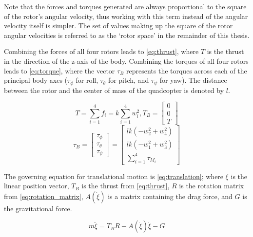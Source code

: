 \documentclass[letterpaper,12pt,titlepage,oneside,final]{book}
\begin{document}
Note that the forces and torques generated are always proportional to the square of the rotor's angular velocity, thus working with this term instead of the angular velocity itself is simpler. %
The set of values making up the square of the rotor angular velocities is referred to as the `rotor space' in the remainder of this thesis.

Combining the forces of all four rotors leads to \eqref{eq:thrust}, where $T$ is the thrust in the direction of the z-axis of the body. 
Combining the torques of all four rotors leads to \eqref{eq:torque}, where the vector $\tau_{B}$ represents the torques across each of the principal body axes ($\tau_{\phi}$ for roll, $\tau_{\theta}$ for pitch, and $\tau_{\psi}$ for yaw). 
The distance between the rotor and the center of mass of the quadcopter is denoted by $l$. 

\begin{equation} \label{eq:thrust}
T = \sum_{i=1}^{4} f_{i} = k\sum_{i=1}^{4} w^{2}_{i} , T_{B} = 
\begin{bmatrix}
0 \\
0 \\
T
\end{bmatrix}
\end{equation}
\begin{equation} \label{eq:torque}
\tau_{B} = 
\begin{bmatrix}
\tau_{\phi} \\
\tau_{\theta} \\
\tau_{\psi}
\end{bmatrix}
=
\begin{bmatrix}
lk(-w_{2}^{2}+w_{4}^{2}) \\
lk(-w_{1}^{2}+w_{3}^{2}) \\
\sum_{i=1}^{4}\tau_{M_{i}}
\end{bmatrix}
\end{equation}

The governing equation for translational motion is \eqref{eq:translation}; where $\xi$ is the linear position vector, $T_{B}$ is the thrust from \eqref{eq:thrust}, $R$ is the rotation matrix from \eqref{eq:rotation_matrix}, $A(\dot{\xi})$ is a matrix containing the drag force, and $G$ is the gravitational force.

\begin{equation} \label{eq:translation}
m\ddot{\xi} = T_{B}R - A(\dot{\xi})\dot{\xi} - G
\end{equation}
\end{document}
